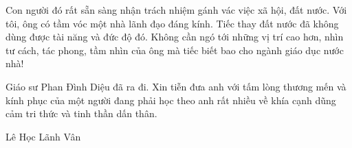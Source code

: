 Con người đó rất sẵn sàng nhận trách nhiệm gánh vác việc xã hội, đất nước. Với tôi, ông có tầm vóc một nhà lãnh đạo đáng kính. Tiếc thay đất nước đã không dùng được tài năng và đức độ đó. Không cần ngó tới những vị trí cao hơn, nhìn tư cách, tác phong, tầm nhìn của ông mà tiếc biết bao cho ngành giáo dục nước nhà!

Giáo sư Phan Đình Diệu đã ra đi. Xin tiễn đưa anh với tấm lòng thương mến và kính phục của một người đang phải học theo anh rất nhiều về khía cạnh dũng cảm tri thức và tinh thần dấn thân.

Lê Học Lãnh Vân